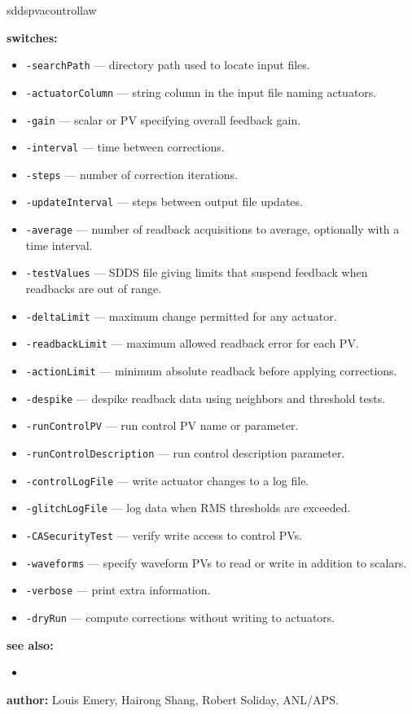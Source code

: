 \begin{sddsprog}{sddspvacontrollaw}
\item \textbf{switches:}
\begin{itemize}
  \item {\tt -searchPath} --- directory path used to locate input files.
  \item {\tt -actuatorColumn} --- string column in the input file naming actuators.
  \item {\tt -gain} --- scalar or PV specifying overall feedback gain.
  \item {\tt -interval} --- time between corrections.
  \item {\tt -steps} --- number of correction iterations.
  \item {\tt -updateInterval} --- steps between output file updates.
  \item {\tt -average} --- number of readback acquisitions to average, optionally with a time interval.
  \item {\tt -testValues} --- SDDS file giving limits that suspend feedback when readbacks are out of range.
  \item {\tt -deltaLimit} --- maximum change permitted for any actuator.
  \item {\tt -readbackLimit} --- maximum allowed readback error for each PV.
  \item {\tt -actionLimit} --- minimum absolute readback before applying corrections.
  \item {\tt -despike} --- despike readback data using neighbors and threshold tests.
  \item {\tt -runControlPV} --- run control PV name or parameter.
  \item {\tt -runControlDescription} --- run control description parameter.
  \item {\tt -controlLogFile} --- write actuator changes to a log file.
  \item {\tt -glitchLogFile} --- log data when RMS thresholds are exceeded.
  \item {\tt -CASecurityTest} --- verify write access to control PVs.
  \item {\tt -waveforms} --- specify waveform PVs to read or write in addition to scalars.
  \item {\tt -verbose} --- print extra information.
  \item {\tt -dryRun} --- compute corrections without writing to actuators.
\end{itemize}

\item \textbf{see also:}
\begin{itemize}
  \item {}
\end{itemize}

\item \textbf{author:} Louis Emery, Hairong Shang, Robert Soliday, ANL/APS.
\end{sddsprog}
